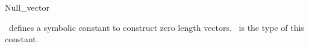 \begin{ccRefClass}{Null_vector}

\ccDefinition
\cgal\ defines a symbolic constant
 to construct zero length vectors.
\ccRefName\ is the type of this constant.

\ccSeeAlso
{} \\
 \\ 

\end{ccRefClass}
